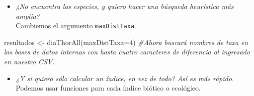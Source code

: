 \documentclass[
]{book}
\newenvironment{Shaded}{\begin{snugshade}}{\end{snugshade}}
\newcommand{\AttributeTok}[1]{\textcolor[rgb]{0.77,0.63,0.00}{#1}}
\newcommand{\CommentTok}[1]{\textcolor[rgb]{0.56,0.35,0.01}{\textit{#1}}}
\newcommand{\DecValTok}[1]{\textcolor[rgb]{0.00,0.00,0.81}{#1}}
\newcommand{\FunctionTok}[1]{\textcolor[rgb]{0.00,0.00,0.00}{#1}}
\newcommand{\NormalTok}[1]{#1}
\newcommand{\OtherTok}[1]{\textcolor[rgb]{0.56,0.35,0.01}{#1}}
\providecommand{\tightlist}{%
  \setlength{\itemsep}{0pt}\setlength{\parskip}{0pt}}
\begin{document}
\begin{itemize}
\tightlist
\item
  \emph{¿No encuentra las especies, y quiero hacer una búsqueda heurística más amplia?}\\
  Cambiemos el argumento \texttt{maxDistTaxa}.
\end{itemize}

\begin{Shaded}
\begin{Highlighting}[]
\NormalTok{resultados }\OtherTok{\textless{}{-}} \FunctionTok{diaThorAll}\NormalTok{(}\AttributeTok{maxDistTaxa=}\DecValTok{4}\NormalTok{) }\CommentTok{\#Ahora buscará nombres de taxa en las bases de datos internas con hasta cuatro caracteres de diferencia al ingresado en nuestro CSV.}
\end{Highlighting}
\end{Shaded}

\begin{itemize}
\tightlist
\item
  \emph{¿Y si quiero sólo calcular un índice, en vez de todo? Así es más rápido.}\\
  Podemos usar funciones para cada índice biótico o ecológico.
\end{itemize}
\end{document}
